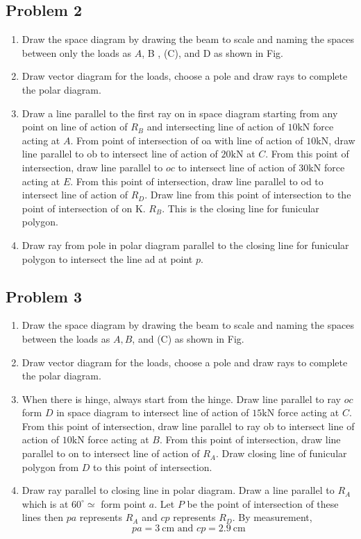 \documentclass[11pt]{article}
\begin{document}
\subsection{Problem 2}
\begin{enumerate}
	\item Draw the space diagram by drawing the beam to scale and naming the spaces between only the loads as $A$, B , (C), and D as shown in Fig.
	\item Draw vector diagram for the loads, choose a pole and draw rays to complete the polar diagram.
	\item Draw a line parallel to the first ray on in space diagram starting from any point on line of action of $R_{B}$ and intersecting line of action of $10 \mathrm{kN}$ force acting at $A$. From point of intersection of oa with line of action of $10 \mathrm{kN}$, draw line parallel to ob to intersect line of action of $20 \mathrm{kN}$ at $C$. From this point of intersection, draw line parallel to $o c$ to intersect line of action of $30 \mathrm{kN}$ force acting at $E$. From this point of intersection, draw line parallel to od to intersect line of action of $R_{D}$. Draw line from this point of intersection to the point of intersection of on $\mathrm{K}$. $R_{B}$. This is the closing line for funicular polygon.
	\item Draw ray from pole in polar diagram parallel to the closing line for funicular polygon to intersect the line ad at point $p$.
\end{enumerate}
	
\subsection{Problem 3}
\begin{enumerate}
	\item Draw the space diagram by drawing the beam to scale and naming the spaces between the loads as $A, B$, and (C) as shown in Fig.
	\item Draw vector diagram for the loads, choose a pole and draw rays to complete the polar diagram.
	\item When there is hinge, always start from the hinge. Draw line parallel to ray $o c$ form $D$ in space diagram to intersect line of action of $15 \mathrm{kN}$ force acting at $C$. From this point of intersection, draw line parallel to ray ob to intersect line of action of $10 \mathrm{kN}$ force acting at $B$. From this point of intersection, draw line parallel to on to intersect line of action of $R_{A} .$ Draw closing line of funicular polygon from $D$ to this point of intersection.
	\item Draw ray parallel to closing line in polar diagram. Draw a line parallel to $R_{A}$ which is at $60^{\circ} \simeq$ form point $a$. Let $P$ be the point of intersection of these lines then $p a$ represents $R_{A}$ and $c p$ represents $R_{D} .$ By measurement,
	$$
	p a=3 \mathrm{~cm} \text { and } c p=2.9 \mathrm{~cm}
	$$
\end{enumerate}
\end{document}
